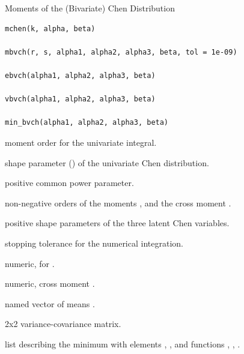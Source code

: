 \documentclass[11pt,a4paper]{article}
\begin{document}
%
\begin{Description}
Moments of the (Bivariate) Chen Distribution
\end{Description}
%
\begin{Usage}
\begin{verbatim}
mchen(k, alpha, beta)

mbvch(r, s, alpha1, alpha2, alpha3, beta, tol = 1e-09)

ebvch(alpha1, alpha2, alpha3, beta)

vbvch(alpha1, alpha2, alpha3, beta)

min_bvch(alpha1, alpha2, alpha3, beta)
\end{verbatim}
\end{Usage}
%
\begin{Arguments}
\begin{ldescription}
\item[\code{k}] moment order for the univariate integral.

\item[\code{alpha}] shape parameter () of the univariate
Chen distribution.

\item[\code{beta}] positive common power parameter.

\item[\code{r}, \code{s}] non-negative orders of the moments ,
 and the cross moment .

\item[\code{alpha1}, \code{alpha2}, \code{alpha3}] positive shape parameters of the three
latent Chen variables.

\item[\code{tol}] stopping tolerance for the numerical integration.
\end{ldescription}
\end{Arguments}
%
\begin{Value}
\begin{ldescription}
\item[\code{mchen}] numeric,  for .
\item[\code{mbvch}] numeric, cross moment .
\item[\code{ebvch}] named vector of means .
\item[\code{vbvch}] 2x2 variance-covariance matrix.
\item[\code{min\_bvch}] list describing the minimum
with elements , , and functions
, , .
\end{ldescription}
\end{Value}
%
\end{document}
